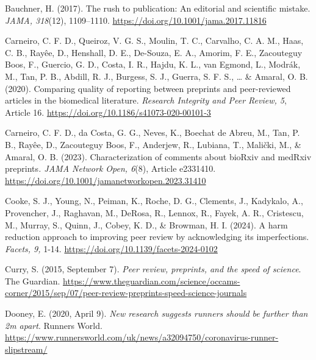 \documentclass[authordate, empirical]{jote-new-article}
\begin{document}
	Bauchner, H. (2017). The rush to publication: An editorial and scientific mistake. \emph{JAMA, 318}(12), 1109--1110. \url{https://doi.org/10.1001/jama.2017.11816}







	Carneiro, C. F. D., Queiroz, V. G. S., Moulin, T. C., Carvalho, C. A. M., Haas, C. B., Rayêe, D., Henshall, D. E., De-Souza, E. A., Amorim, F. E., Zacouteguy Boos, F., Guercio, G. D., Costa, I. R., Hajdu, K. L., van Egmond, L., Modrák, M., Tan, P. B., Abdill, R. J., Burgess, S. J., Guerra, S. F. S., … \& Amaral, O. B. (2020). Comparing quality of reporting between preprints and peer-reviewed articles in the biomedical literature. \emph{Research Integrity and Peer Review, 5}, Article 16. \url{https://doi.org/10.1186/s41073-020-00101-3}







	Carneiro, C. F. D., da Costa, G. G., Neves, K., Boechat de Abreu, M., Tan, P. B., Rayêe, D., Zacouteguy Boos, F., Anderjew, R., Lubiana, T., Malički, M., \& Amaral, O. B. (2023). Characterization of comments about bioRxiv and medRxiv preprints\emph{. JAMA Network Open, 6}(8), Article e2331410. \url{https://doi.org/10.1001/jamanetworkopen.2023.31410}







	Cooke, S. J., Young, N., Peiman, K., Roche, D. G., Clements, J., Kadykalo, A., Provencher, J., Raghavan, M., DeRosa, R., Lennox, R., Fayek, A. R., Cristescu, M., Murray, S., Quinn, J., Cobey, K. D., \& Browman, H. I. (2024). A harm reduction approach to improving peer review by acknowledging its imperfections. \emph{Facets, 9, }1-14. \url{https://doi.org/10.1139/facets-2024-0102}







	Curry, S. (2015, September 7). \emph{Peer review, preprints, and the speed of science}. The Guardian. \url{https://www.theguardian.com/science/occams-corner/2015/sep/07/peer-review-preprints-speed-science-journals}







	Dooney, E. (2020, April 9). \emph{New research suggests runners should be further than 2m apart}. Runners World. \url{https://www.runnersworld.com/uk/news/a32094750/coronavirus-runner-slipstream/}
\end{document}
